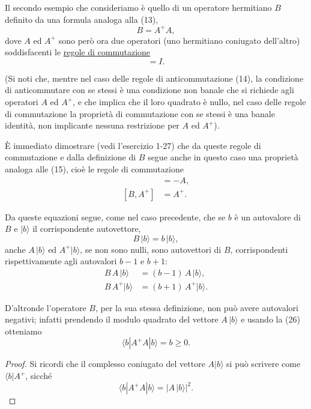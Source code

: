 \documentclass[11pt, a4paper]{book}
\numberwithin{equation}{section}
\begin{document}
Il secondo esempio che consideriamo è quello di un operatore hermitiano
$B$ definito da una formula analoga alla (13),
\begin{equation}
B = A^+A,
\end{equation}
dove $A$ ed $A^+$ sono però ora due operatori (uno hermitiano coniugato
dell'altro) soddisfacenti le \uline{regole di commutazione}
\begin{equation}
[A, A^+] = I.
\end{equation}

(Si noti che, mentre nel caso delle regole di anticommutazione (14), la
condizione di anticommutare con se stessi è una condizione non banale che
si richiede agli operatori $A$ ed $A^+$, e che implica che il loro
quadrato è nullo, nel caso delle regole di commutazione la proprietà di
commutazione con se stessi è una banale identità, non implicante nessuna
restrizione per $A$ ed $A^+$).

È immediato dimostrare (vedi l'esercizio 1-27) che da queste regole di
commutazione e dalla definizione di $B$ segue anche in questo caso una
proprietà analoga alle (15), cioè le regole di commutazione
\begin{align}
[B, A]   &= -A,   \tag{25a} \\
[B, A^+] &= A^+.  \tag{25b}
\end{align}


Da queste equazioni segue, come nel caso precedente, che se $b$ è un
autovalore di $B$ e $|b\rangle$ il corrispondente autovettore,
\begin{equation}
B\,|b\rangle = b\,|b\rangle,
\end{equation}
anche $A\,|b\rangle$ ed $A^+|b\rangle$, se non sono nulli, sono
autovettori di $B$, corrispondenti rispettivamente agli autovalori $b-1$ e
$b+1$:
\begin{align}
B\,A\,|b\rangle   &= (b-1)\,A\,|b\rangle,   \tag{27a} \\
B\,A^+|b\rangle   &= (b+1)\,A^+|b\rangle.   \tag{27b}
\end{align}

D'altronde l'operatore $B$, per la sua stessa definizione, non può avere
autovalori negativi; infatti prendendo il modulo quadrato del vettore
$A\,|b\rangle$ e usando la (26) otteniamo
\begin{equation}
\langle b|A^+A|b\rangle = b \geq 0.
\end{equation}

\begin{proof}
Si ricordi che il complesso coniugato del vettore $A|b\rangle$ si può
scrivere come $\langle b|A^+$, sicché
\[
\langle b|A^+A|b\rangle = |A\,|b\rangle|^2.
\]
\end{proof}
\end{document}
